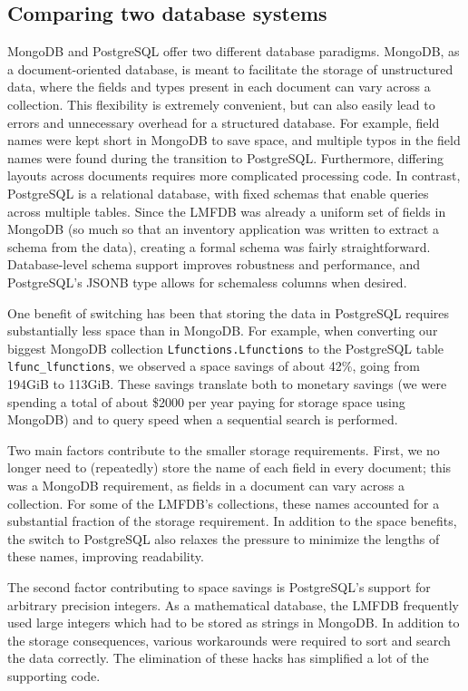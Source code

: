 \documentclass{amsart}
\begin{document}
\subsection{Comparing two database systems}

MongoDB and PostgreSQL offer two different database paradigms.
MongoDB, as a document-oriented database, is meant to facilitate the storage of unstructured data, where the fields and types present in each document can vary across a collection.
This flexibility is extremely convenient, but can also easily lead to errors and unnecessary overhead for a structured database.
For example, field names were kept short in MongoDB to save space, and multiple typos in the field names were found during the transition to PostgreSQL.
Furthermore, differing layouts across documents requires more complicated processing code.
In contrast, PostgreSQL is a relational database, with fixed schemas that enable queries across multiple tables.
Since the LMFDB was already a uniform set of fields in MongoDB (so much so that an inventory application was written to extract a schema from the data), creating a formal schema was fairly straightforward.
Database-level schema support improves robustness and performance, and PostgreSQL's JSONB type allows for schemaless columns when desired.


One benefit of switching has been that storing the data in PostgreSQL requires substantially less space than in MongoDB.
For example, when converting our biggest MongoDB collection \texttt{Lfunctions.Lfunctions} to the PostgreSQL table \texttt{lfunc\_lfunctions}, we observed a space savings of about 42\%, going from 194GiB to 113GiB.
These savings translate both to monetary savings (we were spending a total of about \$2000 per year paying for storage space using MongoDB) and to query speed when a sequential search is performed.



Two main factors contribute to the smaller storage requirements.
First, we no longer need to (repeatedly) store the name of each field in every document; this was a MongoDB requirement, as fields in a document can vary across a collection.
For some of the LMFDB's collections, these names accounted for a substantial fraction of the storage requirement.
In addition to the space benefits, the switch to PostgreSQL also relaxes the pressure to minimize the lengths of these names, improving readability.

The second factor contributing to space savings is PostgreSQL's support for arbitrary precision integers.
As a mathematical database, the LMFDB frequently used large integers which had to be stored as strings in MongoDB.
In addition to the storage consequences, various workarounds were required to sort and search the data correctly.
The elimination of these hacks has simplified a lot of the supporting code.
\end{document}
